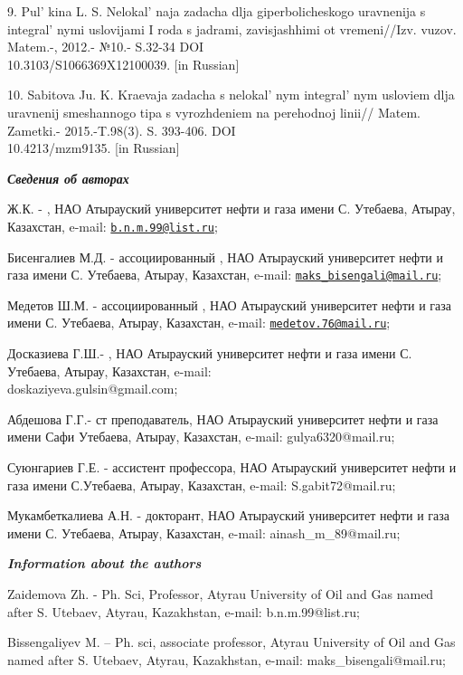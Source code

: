 \begin{references}
9. Pul' kina L. S. Nelokal' naja zadacha
dlja giperbolicheskogo uravnenija s integral' nymi
uslovijami I roda s jadrami, zavisjashhimi ot vremeni//Izv. vuzov.
Matem.-, 2012.- №10.- S.32-34 DOI \\10.3103/S1066369X12100039. {[}in
Russian{]}

10. Sabitova Ju. K. Kraevaja zadacha s nelokal' nym
integral' nym usloviem dlja uravnenij smeshannogo tipa s
vyrozhdeniem na perehodnoj linii// Matem. Zametki.- 2015.-T.98(3). S.
393-406. DOI \\10.4213/mzm9135. {[}in Russian{]}
\end{references}

\begin{authorinfo}
\emph{{\bfseries Сведения об авторах}}

Ж.К. - , НАО
Атырауский университет нефти и газа имени С. Утебаева, Атырау,
Казахстан, e-mail: \href{mailto:b.n.m.99@list.ru}{\nolinkurl{b.n.m.99@list.ru}};

Бисенгалиев М.Д. -  ассоциированный
, НАО Атырауский университет нефти и газа имени С.
Утебаева, Атырау, Казахстан, e-mail: \href{mailto:maks\_bisengali@mail.ru}{\nolinkurl{maks\_bisengali@mail.ru}};

Медетов Ш.М. -  ассоциированный
, НАО Атырауский университет нефти и газа имени С.
Утебаева, Атырау, Казахстан, e-mail: \href{mailto:medetov.76@mail.ru}{\nolinkurl{medetov.76@mail.ru}};

Досказиева Г.Ш.- , НАО
Атырауский университет нефти и газа имени С. Утебаева, Атырау,
Казахстан, e-mail: \\doskaziyeva.gulsin@gmail.com;

Абдешова Г.Г.- ст преподаватель, НАО Атырауский университет нефти и газа
имени Сафи Утебаева, Атырау, Казахстан, e-mail: gulya6320@mail.ru;

Суюнгариев Г.Е. -  ассистент профессора,
НАО Атырауский университет нефти и газа имени С.Утебаева, Атырау,
Казахстан, e-mail: S.gabit72@mail.ru;

Мукамбеткалиева А.Н. - докторант, НАО Атырауский университет нефти и
газа имени С. Утебаева, Атырау, Казахстан, e-mail: ainash\_m\_89@mail.ru;

\emph{{\bfseries Information about the authors}}

Zaidemova Zh. - Ph. Sci, Professor, Atyrau Uni󠀁versity of Oil and Gas
nam󠀁ed aft󠀁er S. Ute󠀁baev, Aty󠀁rau, Kaz󠀁akhstan, e-mail:
b.n.m.99@list.ru;

Bissengaliyev M. -- Ph. sci, associate professor, Atyrau Uni󠀁versity of
Oil and Gas nam󠀁ed aft󠀁er S. Ute󠀁baev, Aty󠀁rau, Kaz󠀁akhstan, e-mail:
maks\_bisengali@mail.ru;


\end{authorinfo}
